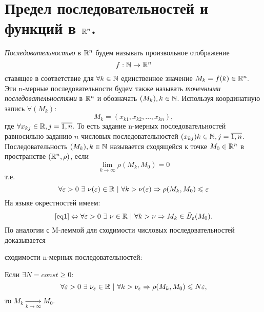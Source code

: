 \documentclass[../../main.tex]{subfiles}
\begin{document}
\section{Предел последовательностей и функций в $\mathbb{R}^n$.}

	\emph{Последовательностью} в $\mathbb{R}^n$ будем называть произвольное отображение
	\[
		f : \mathbb{N} \to \mathbb{R}^n
	\]
  	ставящее в соответствие для $\forall k \in \mathbb{N}$ единственное значение $M_k = f(k) \in \mathbb{R}^n.$ 
  	Эти n-мерные последовательности будем также называть \emph{точечными последовательностями} в $\mathbb{R}^n$ и обозначать $(M_k), k \in \mathbb{N}$.
  	Используя координатную запись $\forall (M_k):$
  	\[
  		M_k = (x_{k1}, x_{k2}, \dots, x_{kn}),
 	\] 
 	где $\forall x_{kj} \in \mathbb{R}, j = \overline{1, n}.$  
	То есть задание n-мерных последовательностей равносильно заданию $n$ числовых последовательностей $(x_{kj}) k \in \mathbb{N}, j = \overline{1,n}$.
	Последовательность $(M_k), k \in \mathbb{N}$ называется сходящейся к точке $M_0 \in \mathbb{R}^n$ в пространстве $(\mathbb{R}^n, \rho)$, если
	\[
		\lim_{k \to \infty}{\rho(M_k, M_0)} = 0
	\]
	т.е. 
	\begin{equation}
	\label{eq1}
		\forall \varepsilon > 0\ \exists\ \nu(\varepsilon) \in \R\ |\ \forall k > \nu(\varepsilon) \Rightarrow \rho(M_k, M_0) \leqslant \varepsilon 
	\end{equation}
	На языке окрестностей имеем:
	\[
		\eqref{eq1} \Leftrightarrow \forall \varepsilon > 0\ \exists\ \nu \in \mathbb{R}\ |\ \forall k > \nu  \Rightarrow M_k \in \bar B_\varepsilon(M_0).
	\]
	По аналогии с M-леммой для сходимости числовых последовательностей доказывается
	\begin{lem}[N-лемма]
		сходимости n-мерных последовательностей:
		
		Если $\exists N = const \geqslant 0:$
		\[
			\forall \varepsilon > 0\ \exists\ \nu_\varepsilon \in \R\ |\ \forall k > \nu_\varepsilon \Rightarrow \rho(M_k, M_0) \leqslant N \varepsilon,
		\]
		то $M_k \underset{k\rightarrow\infty}{\longrightarrow}  M_0.$
	\end{lem}
\end{document}
